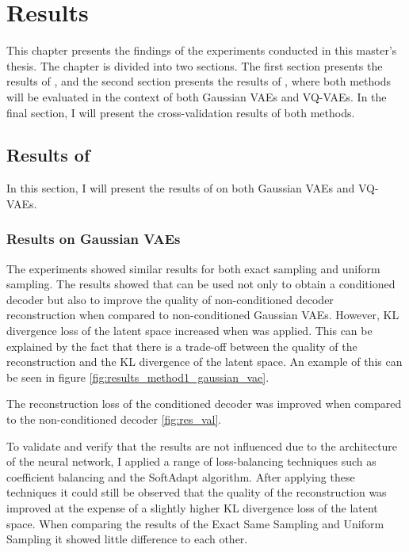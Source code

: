 \chapter{Results}

This chapter presents the findings of the experiments conducted in this master's thesis. The chapter is divided into two sections.
The first section presents the results of , and the second section presents the results of , where both methods will be evaluated in the context of both Gaussian VAEs and VQ-VAEs. In the final section, I will present the cross-validation results of both methods.

\section{Results of }

In this section, I will present the results of  on both Gaussian VAEs and VQ-VAEs.

\subsection{Results on Gaussian VAEs}

The experiments showed similar results for both exact sampling and uniform sampling. The results showed that  can be used not only to obtain a conditioned decoder but also to improve the quality of non-conditioned decoder reconstruction when compared to non-conditioned Gaussian VAEs. However, KL divergence loss of the latent space increased when  was applied. This can be explained by the fact that there is a trade-off between the quality of the reconstruction and the KL divergence of the latent space. An example of this can be seen in figure \ref{fig:results_method1_gaussian_vae}. 

The reconstruction loss of the conditioned decoder was improved when compared to the non-conditioned decoder \ref{fig:res_val}.

To validate and verify that the results are not influenced due to the architecture of the neural network, I applied a range of loss-balancing techniques such as coefficient balancing and the SoftAdapt algorithm. After applying these techniques it could still be observed that the quality of the reconstruction was improved at the expense of a slightly higher KL divergence loss of the latent space. When comparing the results of the Exact Same Sampling and Uniform Sampling it showed little difference to each other.

